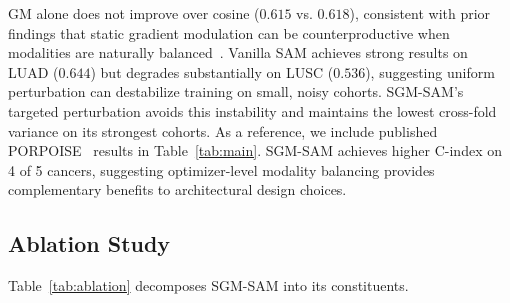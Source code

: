 \documentclass[10pt]{article}\usepackage[utf8]{inputenc}\usepackage[T1]{fontenc}\usepackage{amsmath,amssymb,amsfonts,bm}\usepackage{booktabs}\usepackage{multirow}\usepackage{array}\usepackage{graphicx}\usepackage{algorithm}\usepackage{algorithmic}\usepackage{xcolor}\usepackage[margin=1in]{geometry}\usepackage{microtype}
\begin{document}
GM alone does not improve over cosine ($0.615$ vs. $0.618$), consistent with prior findings that static gradient modulation can be counterproductive when modalities are naturally balanced~\cite{peng2022balanced}. Vanilla SAM achieves strong results on LUAD ($0.644$) but degrades substantially on LUSC ($0.536$), suggesting uniform perturbation can destabilize training on small, noisy cohorts. SGM-SAM's targeted perturbation avoids this instability and maintains the lowest cross-fold variance on its strongest cohorts. As a reference, we include published PORPOISE~\cite{chen2022porpoise} results in Table~\ref{tab:main}. SGM-SAM achieves higher C-index on 4 of 5 cancers, suggesting optimizer-level modality balancing provides complementary benefits to architectural design choices.

\subsection{Ablation Study}
Table~\ref{tab:ablation} decomposes SGM-SAM into its constituents.
\end{document}
